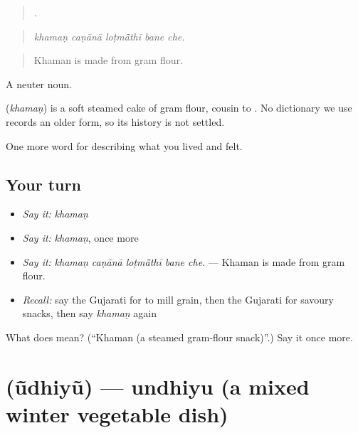 \begin{quote}
    .
\end{quote}

\begin{quote}
\emph{khamaṇ caṇānā loṭmā̃thī bane che.}
\end{quote}

\begin{quote}
Khaman is made from gram flour.
\end{quote}

A neuter noun.

\begin{cousinweb}
\textbf{} (\emph{khamaṇ}) is a soft steamed cake of gram flour, cousin to \textbf{}. No dictionary we use records an older form, so its history is not settled.
\end{cousinweb}

\begin{grammarlens}[title={What you've built}]
One more word for describing what you lived and felt.
\end{grammarlens}

\subsection*{Your turn}
\begin{itemize}
\raggedright
  \item \emph{Say it:} \emph{khamaṇ}
  \item \emph{Say it:} \emph{khamaṇ}, once more
  \item \emph{Say it:} \emph{khamaṇ caṇānā loṭmā̃thī bane che.} — Khaman is made from gram flour.
  \item \emph{Recall:} say the Gujarati for to mill grain, then the Gujarati for savoury snacks, then say \emph{khamaṇ} again
\end{itemize}

\begin{tcolorbox}[breakable,colback=teal!4,colframe=teal!35!black,title={Before you move on}]
What does  mean? (\textquotedblleft{}Khaman (a steamed gram-flour snack)\textquotedblright{}.) Say it once more.
\end{tcolorbox}
\section[\texorpdfstring{\gu{ઊંધિયું} (ū̃dhiyũ)}{ઊંધિયું (ū̃dhiyũ)}]{ (ū̃dhiyũ) — undhiyu (a mixed winter vegetable dish)}


